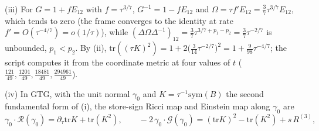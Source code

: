 (iii) For $G = 1 + fE_{12}$ with $f = \tau^{3/7}$, $G^{-1} = 1 - fE_{12}$ and $\Omega = \tau f'E_{12} = \tfrac37\tau^{3/7}E_{12}$, which tends to zero (the frame converges to the identity at rate $f' = O(\tau^{-4/7}) = o(1/\tau)$), while $(\Delta\Omega\Delta^{-1})_{12} = \tfrac37\tau^{3/7 + p_{1} - p_{2}} = \tfrac37\tau^{-2/7}$ is unbounded, $p_{1} < p_{2}$. By (ii), $\mathrm{tr}((\tau K)^{2}) = 1 + 2\bigl(\tfrac{3}{14}\tau^{-2/7}\bigr)^{2} = 1 + \tfrac{9}{98}\tau^{-4/7}$; the script computes it from the coordinate metric at four values of $t$ ($\tfrac{121}{49}, \tfrac{1201}{49}, \tfrac{18481}{49}, \tfrac{294961}{49}$).

(iv) In GTG, with the unit normal $\gamma_{0}$ and $K = \tau^{-1}\mathrm{sym}(B)$ the second fundamental form of (i), the store-sign Ricci map and Einstein map along $\gamma_{0}$ are
\[
\gamma_{0} \cdot \mathcal{R}(\gamma_{0}) = \partial_{\tau}\mathrm{tr}K + \mathrm{tr}(K^{2}), \qquad -2\,\gamma_{0} \cdot \mathcal{G}(\gamma_{0}) = (\mathrm{tr}K)^{2} - \mathrm{tr}(K^{2}) + s\,R^{(3)},
\]
